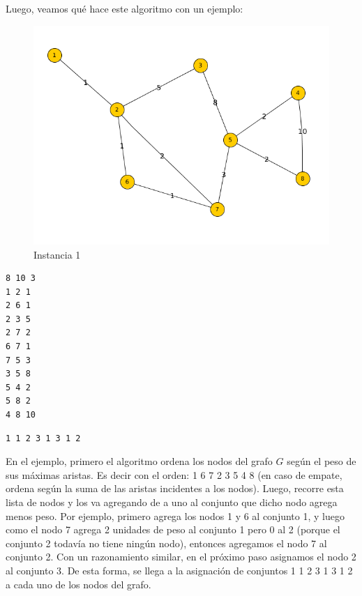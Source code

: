 \documentclass[11pt, a4paper, twoside]{article}
\begin{document}
\begin{enumerate}
		Luego, veamos qué hace este algoritmo con un ejemplo:	
		\begin{figure}[H]
		\includegraphics[scale=1]{imagenes/ej2.png}
		\caption{Instancia 1}
		\end{figure}
		
\begin{minipage}[t]{0.4\textwidth}
\begin{Verbatim}[frame=single,framesep=1cm,label= Ejemplo de entrada: instancia 1]
8 10 3
1 2 1
2 6 1
2 3 5
2 7 2
6 7 1
7 5 3
3 5 8
5 4 2
5 8 2
4 8 10
\end{Verbatim}
\end{minipage}
\hfill
\begin{minipage}[t]{0.4\textwidth}
\begin{Verbatim}[frame=single,framesep=1cm,label= Ejemplo de salida: instancia 1]
1 1 2 3 1 3 1 2
\end{Verbatim}
\end{minipage}
		
		En el ejemplo, primero el algoritmo ordena los nodos del grafo $G$ según el peso de sus máximas
		aristas. Es decir con el orden: 1 6 7 2 3 5 4 8 (en caso de empate, ordena según la suma de las aristas
		incidentes a los nodos). Luego, recorre esta lista de nodos y los va agregando de a uno al conjunto que
		dicho nodo agrega menos peso. Por ejemplo, primero agrega los nodos 1 y 6 al conjunto 1, y luego como el
		nodo 7 agrega 2 unidades de peso al conjunto 1 pero 0 al 2 (porque el conjunto 2 todavía no tiene ningún
		nodo), entonces agregamos el nodo 7 al conjunto 2. Con un razonamiento similar, en el próximo paso asignamos
		el nodo 2 al conjunto 3. De esta forma, se llega a la asignación de conjuntos 1 1 2 3 1 3 1 2 a cada uno de
		los nodos del grafo.
		

\end{enumerate}
\end{document}
